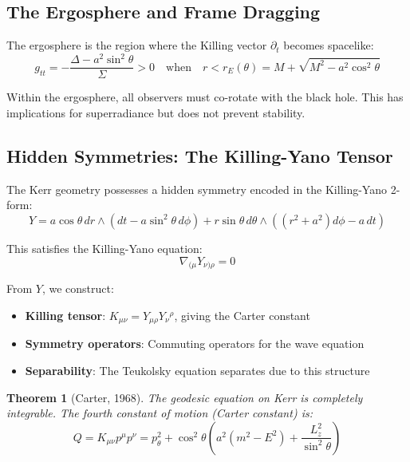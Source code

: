\documentclass[12pt,a4paper]{article}
\newtheorem{theorem}{Theorem}[section]
\begin{document}
\subsection{The Ergosphere and Frame Dragging}

The ergosphere is the region where the Killing vector $\partial_t$ becomes spacelike:
\begin{equation}
g_{tt} = -\frac{\Delta - a^2\sin^2\theta}{\Sigma} > 0 \quad \text{when} \quad r < r_E(\theta) = M + \sqrt{M^2 - a^2\cos^2\theta}
\end{equation}

Within the ergosphere, all observers must co-rotate with the black hole. This has implications for superradiance but does not prevent stability.

\subsection{Hidden Symmetries: The Killing-Yano Tensor}

The Kerr geometry possesses a hidden symmetry encoded in the Killing-Yano 2-form:
\begin{equation}
Y = a\cos\theta\, dr \wedge (dt - a\sin^2\theta\, d\phi) + r\sin\theta\, d\theta \wedge ((r^2+a^2)d\phi - a\,dt)
\end{equation}

This satisfies the Killing-Yano equation:
\begin{equation}
\nabla_{(\mu}Y_{\nu)\rho} = 0
\end{equation}

From $Y$, we construct:
\begin{itemize}
    \item \textbf{Killing tensor}: $K_{\mu\nu} = Y_{\mu\rho}Y_\nu{}^\rho$, giving the Carter constant
    \item \textbf{Symmetry operators}: Commuting operators for the wave equation
    \item \textbf{Separability}: The Teukolsky equation separates due to this structure
\end{itemize}

\begin{theorem}[Carter, 1968]
The geodesic equation on Kerr is completely integrable. The fourth constant of motion (Carter constant) is:
\begin{equation}
Q = K_{\mu\nu}p^\mu p^\nu = p_\theta^2 + \cos^2\theta\left(a^2(m^2 - E^2) + \frac{L_z^2}{\sin^2\theta}\right)
\end{equation}
\end{theorem}
\end{document}
